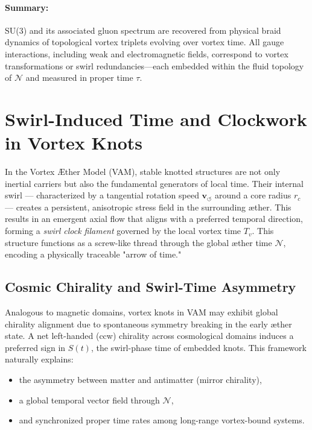 \documentclass[12pt]{article}
\begin{document}
\paragraph{Summary:} SU(3) and its associated gluon spectrum are recovered from physical braid dynamics of topological vortex triplets evolving over vortex time. All gauge interactions, including weak and electromagnetic fields, correspond to vortex transformations or swirl redundancies—each embedded within the fluid topology of \( \mathcal{N} \) and measured in proper time \( \tau \).
\section{Swirl-Induced Time and Clockwork in Vortex Knots}

In the Vortex \AE{}ther Model (VAM), stable knotted structures are not only inertial carriers but also the fundamental generators of local time. Their internal swirl — characterized by a tangential rotation speed \( \mathbf{v}_{\scriptscriptstyle\boldsymbol{\circlearrowleft}} \) around a core radius \( r_c \) — creates a persistent, anisotropic stress field in the surrounding æther. This results in an emergent axial flow that aligns with a preferred temporal direction, forming a \emph{swirl clock filament} governed by the local vortex time \( T_v \). This structure functions as a screw-like thread through the global æther time \( \mathcal{N} \), encoding a physically traceable "arrow of time."

\subsection*{Cosmic Chirality and Swirl-Time Asymmetry}

Analogous to magnetic domains, vortex knots in VAM may exhibit global chirality alignment due to spontaneous symmetry breaking in the early æther state. A net left-handed (ccw) chirality across cosmological domains induces a preferred sign in \( S(t) \), the swirl-phase time of embedded knots. This framework naturally explains:
\begin{itemize}
  \item the asymmetry between matter and antimatter (mirror chirality),
  \item a global temporal vector field through \( \mathcal{N} \),
  \item and synchronized proper time rates among long-range vortex-bound systems.
\end{itemize}
\end{document}
